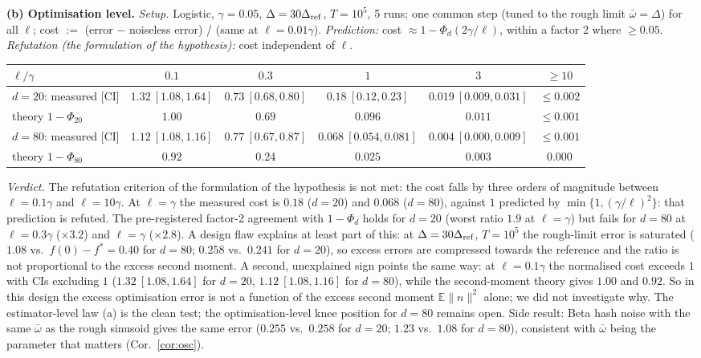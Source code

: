 \documentclass[11pt,a4paper]{article}
\numberwithin{equation}{section}
\theoremstyle{definition}
\theoremstyle{remark}
\newcommand{\E}{\mathbb E}\newcommand{\R}{\mathbb R}\newcommand{\Z}{\mathbb Z}\newcommand{\Prob}{\mathbb P}
\newcommand{\norm}[1]{\lVert #1\rVert}\newcommand{\abs}[1]{\lvert #1\rvert}\newcommand{\ip}[2]{\langle #1,#2\rangle}
\newcommand{\wbar}{\bar\omega}\newcommand{\Atwo}{\cA^{\rm 2pt}_\gamma}
\begin{document}
\textbf{(b) Optimisation level.} \emph{Setup.} Logistic, $\gamma=0.05$, $\Delta=30\Delta_{\rm ref}$, $T=10^5$, 5 runs; one common step (tuned to the rough limit $\wbar=\Delta$) for all $\ell$; cost $:=$ (error $-$ noiseless error) / (same at $\ell=0.01\gamma$). \emph{Prediction:} cost $\approx1-\Phi_d(2\gamma/\ell)$, within a factor 2 where $\ge0.05$. \emph{Refutation (the formulation of the hypothesis):} cost independent of $\ell$.
\begin{center}\footnotesize\setlength{\tabcolsep}{3pt}
\begin{tabular}{@{}lccccc@{}}
\toprule
$\ell/\gamma$ & $0.1$ & $0.3$ & $1$ & $3$ & $\ge10$\\
\midrule
$d=20$: measured [CI] & $1.32\ [1.08,1.64]$ & $0.73\ [0.68,0.80]$ & $0.18\ [0.12,0.23]$ & $0.019\ [0.009,0.031]$ & $\le0.002$\\
\quad theory $1-\Phi_{20}$ & $1.00$ & $0.69$ & $0.096$ & $0.011$ & $\le0.001$\\
$d=80$: measured [CI] & $1.12\ [1.08,1.16]$ & $0.77\ [0.67,0.87]$ & $0.068\ [0.054,0.081]$ & $0.004\ [0.000,0.009]$ & $\le0.001$\\
\quad theory $1-\Phi_{80}$ & $0.92$ & $0.24$ & $0.025$ & $0.003$ & $0.000$\\
\bottomrule
\end{tabular}
\end{center}
\emph{Verdict.} The refutation criterion of the formulation of the hypothesis is not met: the cost falls by three orders of magnitude between $\ell=0.1\gamma$ and $\ell=10\gamma$. At $\ell=\gamma$ the measured cost is $0.18$ ($d=20$) and $0.068$ ($d=80$), against $1$ predicted by $\min\{1,(\gamma/\ell)^2\}$: that prediction is refuted. The pre-registered factor-2 agreement with $1-\Phi_d$ holds for $d=20$ (worst ratio $1.9$ at $\ell=\gamma$) but fails for $d=80$ at $\ell=0.3\gamma$ ($\times3.2$) and $\ell=\gamma$ ($\times2.8$). A design flaw explains at least part of this: at $\Delta=30\Delta_{\rm ref}$, $T=10^5$ the rough-limit error is saturated ($1.08$ vs.\ $f(0)-f^*=0.40$ for $d=80$; $0.258$ vs.\ $0.241$ for $d=20$), so excess errors are compressed towards the reference and the ratio is not proportional to the excess second moment. A second, unexplained sign points the same way: at $\ell=0.1\gamma$ the normalised cost exceeds $1$ with CIs excluding $1$ ($1.32\ [1.08,1.64]$ for $d=20$, $1.12\ [1.08,1.16]$ for $d=80$), while the second-moment theory gives $1.00$ and $0.92$. So in this design the excess optimisation error is not a function of the excess second moment $\E\norm n^2$ alone; we did not investigate why. The estimator-level law (a) is the clean test; the optimisation-level knee position for $d=80$ remains open. Side result: Beta hash noise with the same $\wbar$ as the rough sinusoid gives the same error ($0.255$ vs.\ $0.258$ for $d=20$; $1.23$ vs.\ $1.08$ for $d=80$), consistent with $\wbar$ being the parameter that matters (Cor.~\ref{cor:osc}).
\end{document}

